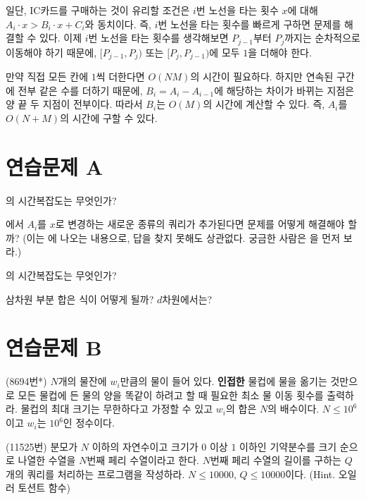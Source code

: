 일단, IC카드를 구매하는 것이 유리할 조건은 $i$번 노선을 타는 횟수 $x$에 대해 $A_i \cdot x > B_i \cdot x + C_i$와 동치이다. 즉, $i$번 노선을 타는 횟수를 빠르게 구하면 문제를 해결할 수 있다. 이제 $i$번 노선을 타는 횟수를 생각해보면 $P_{j-1}$부터 $P_j$까지는 순차적으로 이동해야 하기 때문에, $[P_{j-1}, P_j)$ 또는 $[P_j, P_{j-1})$에 모두 $1$을 더해야 한다.

만약 직접 모든 칸에 $1$씩 더한다면 $O(NM)$의 시간이 필요하다. 하지만 연속된 구간에 전부 같은 수를 더하기 때문에, $B_i = A_i - A_{i-1}$에 해당하는 차이가 바뀌는 지점은 양 끝 두 지점이 전부이다. 따라서 $B_i$는 $O(M)$의 시간에 계산할 수 있다. 즉, $A_i$를 $O(N+M)$의 시간에 구할 수 있다.

\section{연습문제 A}
\begin{problem}
    의 시간복잡도는 무엇인가?
\end{problem}
\begin{problem}
    에서 $A_i$를 $x$로 변경하는 새로운 종류의 쿼리가 추가된다면 문제를 어떻게 해결해야 할까?
    (이는 에 나오는 내용으로, 답을 찾지 못해도 상관없다. 궁금한 사람은 을 먼저 보라.)
\end{problem}
\begin{problem}
    의 시간복잡도는 무엇인가?
\end{problem}
\begin{problem}
    삼차원 부분 합은 식이 어떻게 될까? $d$차원에서는?
\end{problem}

\section{연습문제 B}

\begin{problem}
    (8694번*) $N$개의 물잔에 $w_i$만큼의 물이 들어 있다. \textbf{인접한} 물컵에 물을 옮기는 것만으로 모든 물컵에 든 물의 양을 똑같이 하려고 할 때 필요한 최소 물 이동 횟수를 출력하라. 물컵의 최대 크기는 무한하다고 가정할 수 있고 $w_i$의 합은 $N$의 배수이다. $N \leq 10^6$이고 $w_i$는 $10^6$인 정수이다.
\end{problem}

\begin{problem}
    (11525번) 분모가 $N$ 이하의 자연수이고 크기가 $0$ 이상 $1$ 이하인 기약분수를 크기 순으로 나열한 수열을 $N$번째 페리 수열이라고 한다. $N$번째 페리 수열의 길이를 구하는 $Q$개의 쿼리를 처리하는 프로그램을 작성하라. $N \leq 10000$, $Q \leq 10000$이다. (Hint. 오일러 토션트 함수)
\end{problem}

